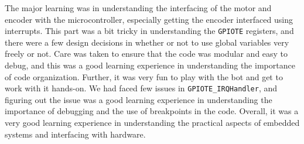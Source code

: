 The major learning was in understanding the interfacing of the motor and encoder with the microcontroller, especially getting the encoder interfaced using interrupts.
This part was a bit tricky in understanding the \texttt{GPIOTE} registers, and there were a few design decisions in whether or not to use global variables very freely or not.
Care was taken to ensure that the code was modular and easy to debug, and this was a good learning experience in understanding the importance of code organization.
Further, it was very fun to play with the bot and get to work with it hands-on.
We had faced few issues in \texttt{GPIOTE\_IRQHandler}, and figuring out the issue was a good learning experience in understanding the importance of debugging and the use of breakpoints in the code.
Overall, it was a very good learning experience in understanding the practical aspects of embedded systems and interfacing with hardware.
